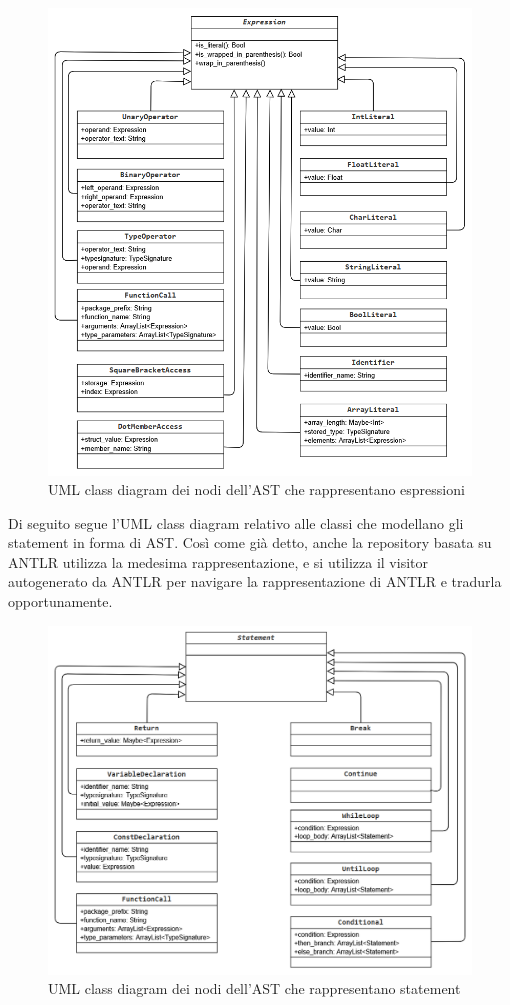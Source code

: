 \begin{figure}[H]
    \centering
        \includegraphics[width=1\textwidth]{../../Assets/AstExpr.png}
    \caption{UML class diagram dei nodi dell'AST che rappresentano espressioni}
\end{figure}

\newpage

Di seguito segue l'UML class diagram relativo alle classi che modellano 
gli statement in forma di AST. Così come già detto, anche la repository
basata su ANTLR utilizza la medesima rappresentazione, e si utilizza il visitor
autogenerato da ANTLR per navigare la rappresentazione di ANTLR e tradurla opportunamente.

\begin{figure}[H]
    \centering
        \includegraphics[width=1\textwidth]{../../Assets/StatementAST.png}
    \caption{UML class diagram dei nodi dell'AST che rappresentano statement}
\end{figure}

